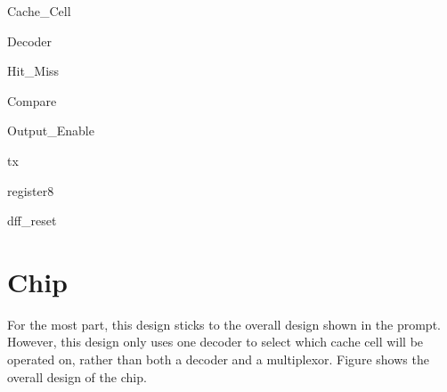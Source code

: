 \documentclass[10pt]{article}
\begin{document}
\begin{longenum}
\begin{longenum}
\begin{longenum}
\begin{longenum}
\begin{longenum}
                    \item Cache_Cell
                    \end{longenum}
                \end{longenum}
            \end{longenum}
        \item Decoder
        \item Hit_Miss
            \begin{longenum}
            \item Compare
            \end{longenum}
        \item Output_Enable
            \begin{longenum}
            \item tx
            \end{longenum}
        \item register8
            \begin{longenum}
            \item dff_reset
            \end{longenum}
        \end{longenum}
    \end{longenum}
\section{Chip}
    For the most part, this design sticks to the overall design shown in the
prompt. However, this design only uses one decoder to select which cache cell
will be operated on, rather than both a decoder and a multiplexor. Figure
 shows the overall design of the chip.
\end{document}
